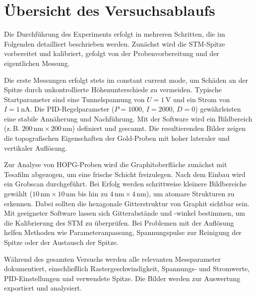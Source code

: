 \chapter{Übersicht des Versuchsablaufs}


Die Durchführung des Experiments erfolgt in mehreren Schritten, die im Folgenden detailliert beschrieben werden. Zunächst wird die STM-Spitze vorbereitet und kalibriert, gefolgt von der Probenvorbereitung und der eigentlichen Messung.

Die erste Messungen erfolgt stets im constant current mode, um Schäden an der Spitze durch unkontrollierte Höhenunterschiede zu vermeiden. Typische Startparameter sind eine Tunnelspannung von $U = 1\,\text{V}$ und ein Strom von $I = 1\,\text{nA}$. Die PID-Regelparameter ($P = 1000$, $I = 2000$, $D = 0$) gewährleisten eine stabile Annäherung und Nachführung. Mit der Software wird ein Bildbereich (z.\,B. $200\,\text{nm} \times 200\,\text{nm}$) definiert und gescannt. Die resultierenden Bilder zeigen die topografischen Eigenschaften der Gold-Proben mit hoher lateraler und vertikaler Auflösung.

Zur Analyse von HOPG-Proben wird die Graphitoberfläche zunächst mit Tesafilm abgezogen, um eine frische Schicht freizulegen. Nach dem Einbau wird ein Grobscan durchgeführt. Bei Erfolg werden schrittweise kleinere Bildbereiche gewählt ($10\,\text{nm} \times 10\,\text{nm}$ bis hin zu $4\,\text{nm} \times 4\,\text{nm}$), um atomare Strukturen zu erkennen. Dabei sollten die hexagonale Gitterstruktur von Graphit sichtbar sein. Mit geeigneter Software lassen sich Gitterabstände und -winkel bestimmen, um die Kalibrierung des STM zu überprüfen. Bei Problemen mit der Auflösung helfen Methoden wie Parameteranpassung, Spannungspulse zur Reinigung der Spitze oder der Austausch der Spitze.

Während des gesamten Versuchs werden alle relevanten Messparameter dokumentiert, einschließlich Rastergeschwindigkeit, Spannungs- und Stromwerte, PID-Einstellungen und verwendete Spitze. Die Bilder werden zur Auswertung exportiert und analysiert.
